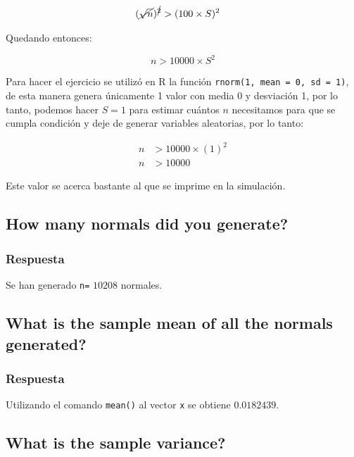 \documentclass[12pt]{article}\usepackage[]{graphicx}\usepackage[]{xcolor}
\begin{document}
\begin{align*}
  (\cancel{\sqrt{n}})^{\cancel{2}} &> (100 \times S)^{2} 
\end{align*}

Quedando entonces:

\[
n > 10000\times S^{2}
\]

Para hacer el ejercicio se utilizó en \textsf{R} la función \texttt{rnorm(1, mean = 0, sd = 1)}, de esta manera genera únicamente 1 valor con media 0 y desviación 1, por lo tanto, podemos hacer $S = 1$ para estimar cuántos $n$ necesitamos para que se cumpla condición y deje de generar variables aleatorias, por lo tanto:

\begin{align*}
  n &> 10000 \times (1)^{2} \\
  n &> 10000 
\end{align*}

Este valor se acerca bastante al que se imprime en la simulación. 











\subsection{How many normals did you generate?}
\label{subsec:p1-b}

\subsubsection{Respuesta}

Se han generado \lstinline|n=| $10208$ normales.


\subsection{What is the sample mean of all the normals generated?}
\label{subsec:p1-c}




\subsubsection{Respuesta}

Utilizando el comando \lstinline|mean()| al vector \lstinline|x| se obtiene $0.0182439$. 

\subsection{What is the sample variance?}
\label{subsec:p1-d}
\end{document}
